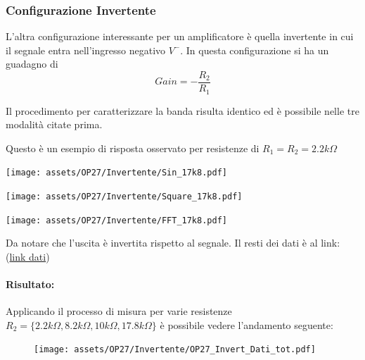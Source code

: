 \subsubsection{Configurazione Invertente}

L'altra configurazione interessante per un amplificatore è quella invertente in cui il segnale entra nell'ingresso negativo $V^-$.
 In questa configurazione si ha un guadagno di $$Gain = -\frac{R_2}{R_1}$$

 Il procedimento per caratterizzare la banda risulta identico ed è possibile nelle tre modalità citate prima.

 Questo è un esempio di risposta osservato per resistenze di $R_1 = R_2 = 2.2k\Omega$

\begin{minipage}{\textwidth}

    \centering
    \begin{minipage}[b]{0.3\textwidth}
        \texttt{[image: assets/OP27/Invertente/Sin\_17k8.pdf]}
    \end{minipage}
    \hfill
    \begin{minipage}[b]{0.3\textwidth}
        \texttt{[image: assets/OP27/Invertente/Square\_17k8.pdf]}
    \end{minipage}
    \hfill
    \begin{minipage}[b]{0.3\textwidth}
        \texttt{[image: assets/OP27/Invertente/FFT\_17k8.pdf]}
    \end{minipage}
    \hfill    
\end{minipage}

Da notare che l'uscita è invertita rispetto al segnale. Il resti dei dati è al link: (\href{https://github.com/Yedi278/Esperimentazioni-Elettronica/tree/main/-\%20OPAMP/OP27/Invertente}{link dati})

\paragraph{Risultato:}
Applicando il processo di misura per varie resistenze $R_2 = \{ 2.2k\Omega, 8.2k\Omega, 10k\Omega, 17.8k\Omega \}$ è possibile vedere l'andamento seguente:

\begin{figure}[!h]
    \centering
    \texttt{[image: assets/OP27/Invertente/OP27\_Invert\_Dati\_tot.pdf]}
\end{figure}

